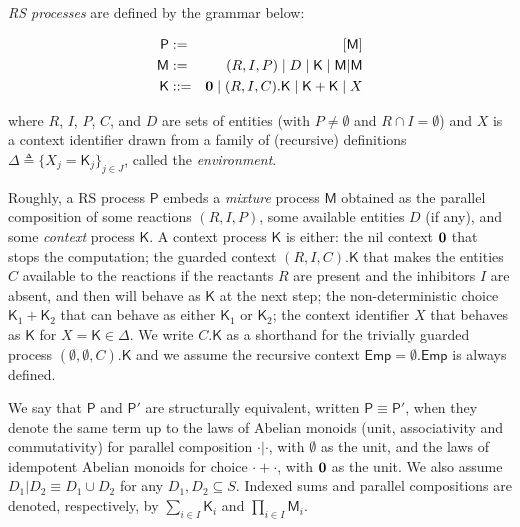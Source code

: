 \begin{definition}[RS processes]\label{def:LTSforRS}
\emph{RS processes} are defined by the grammar below:

\begin{eqnarray*}
\mathsf{P} & := & [\mathsf{M}]
\\
\mathsf{M} & := & (R,I,P) \mid D \mid \mathsf{K} \mid \mathsf{M}|\mathsf{M}
\\
\mathsf{K} & ::= & \mathbf{0} \mid (R,I,C).\mathsf{K} \mid \mathsf{K}+\mathsf{K} \mid X
\end{eqnarray*}

\noindent
where $R$, $I$, $P$, $C$, and $D$ are sets of entities (with $P\neq \emptyset$ and $R\cap I=\emptyset$) and $X$ is a context identifier drawn from a family of (recursive) definitions $\Delta \triangleq\{X_j=\mathsf{K}_j\}_{j\in J}$, called the \emph{environment}.
\end{definition}

Roughly, a RS process  $\mathsf{P}$ embeds a \emph{mixture} process $\mathsf{M}$ obtained as the parallel composition of some reactions $(R,I,P)$, some available entities $D$ (if any), and some \emph{context} process $\mathsf{K}$.
A  context process $\mathsf{K}$ is either: 
the nil context $\mathbf{0}$ that stops the computation;
the guarded context $(R,I,C).\mathsf{K}$ that makes the entities $C$ available to the reactions if the reactants $R$ are present and the inhibitors $I$ are absent, and then will behave as $\mathsf{K}$ at the next step;
the non-deterministic choice $\mathsf{K}_1+\mathsf{K}_2$ that can behave as either  $\mathsf{K}_1$ or $\mathsf{K}_2$;  
the context identifier $X$ that behaves as $\mathsf{K}$ for $X=\mathsf{K}\in \Delta$.
We write $C.\mathsf{K}$ as a shorthand for the trivially guarded process $(\emptyset,\emptyset,C).\mathsf{K}$ and we assume the recursive context $\mathsf{Emp}=\emptyset.\mathsf{Emp}$ is always defined.


We say that $\mathsf{P}$ and $\mathsf{P}'$ are structurally equivalent, written $\mathsf{P} \equiv \mathsf{P}'$, when they denote the same term up to the laws of Abelian monoids (unit, associativity and commutativity) for  parallel composition $\cdot | \cdot$, with $\emptyset$ as the unit, and the laws of idempotent Abelian monoids for choice $\cdot +\cdot$, with $\mathbf{0}$ as the unit. We also assume $D_1 | D_2 \equiv D_1\cup D_2$ for any $D_1,D_2\subseteq S$.
Indexed sums and parallel compositions are denoted, respectively, by $\sum_{i\in I} \mathsf{K}_i$ and $\prod_{i\in I} \mathsf{M}_i$.

